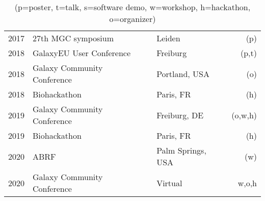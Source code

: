 \begin{table}
\begin{tabular}{llp{1.4cm}lr}
        2017 & 27th MGC symposium                          && Leiden          & (p) \\
        2018 & GalaxyEU User Conference                    && Freiburg        & (p,t) \\
        2018 & Galaxy Community Conference                 && Portland, USA   & (o) \\
        2018 & Biohackathon                                && Paris, FR       & (h) \\
        2019 & Galaxy Community Conference                 && Freiburg, DE    & (o,w,h) \\
        2019 & Biohackathon                                && Paris, FR       & (h) \\
        2020 & ABRF                                        && Palm Springs, USA & (w) \\
        2020 & Galaxy Community Conference                 && Virtual         & {w,o,h} \\
    \end{tabular}
    \caption*{(p=poster, t=talk, s=software demo, w=workshop, h=hackathon, o=organizer)}
\end{table}

